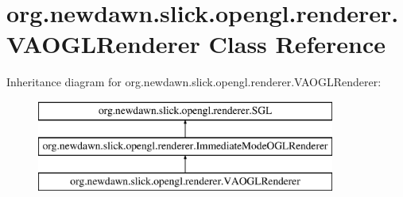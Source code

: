 \hypertarget{classorg_1_1newdawn_1_1slick_1_1opengl_1_1renderer_1_1_v_a_o_g_l_renderer}{}\section{org.\+newdawn.\+slick.\+opengl.\+renderer.\+V\+A\+O\+G\+L\+Renderer Class Reference}
\label{classorg_1_1newdawn_1_1slick_1_1opengl_1_1renderer_1_1_v_a_o_g_l_renderer}
Inheritance diagram for org.\+newdawn.\+slick.\+opengl.\+renderer.\+V\+A\+O\+G\+L\+Renderer\+:\begin{figure}[H]
\begin{center}
\leavevmode
\includegraphics[height=3.000000cm]{classorg_1_1newdawn_1_1slick_1_1opengl_1_1renderer_1_1_v_a_o_g_l_renderer}
\end{center}
\end{figure}
